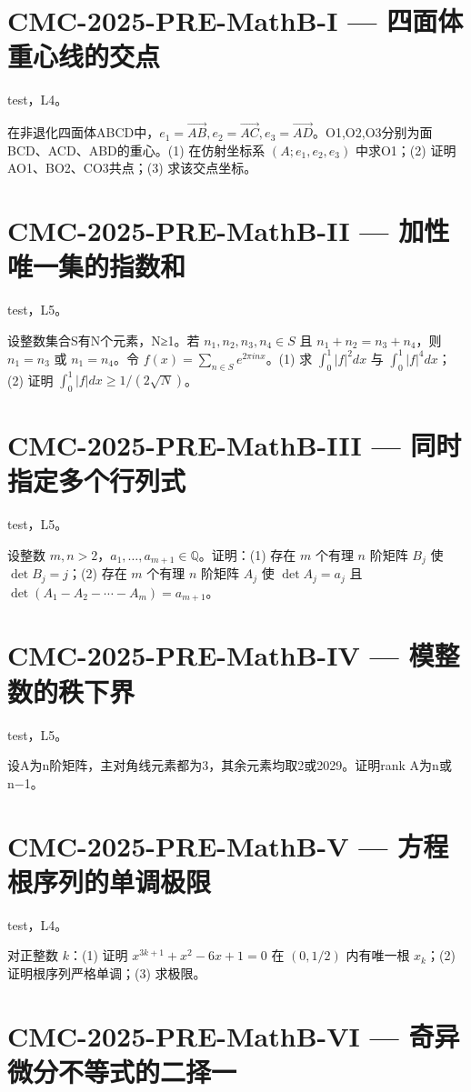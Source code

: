 \documentclass[UTF8]{ctexart}
\begin{document}
\section*{CMC-2025-PRE-MathB-I — 四面体重心线的交点}

test，L4。

在非退化四面体ABCD中，$e_1=\overrightarrow{AB},e_2=\overrightarrow{AC},e_3=\overrightarrow{AD}$。O1,O2,O3分别为面BCD、ACD、ABD的重心。(1) 在仿射坐标系 $(A;e_1,e_2,e_3)$ 中求O1；(2) 证明AO1、BO2、CO3共点；(3) 求该交点坐标。

\section*{CMC-2025-PRE-MathB-II — 加性唯一集的指数和}

test，L5。

设整数集合S有N个元素，N≥1。若 $n_1,n_2,n_3,n_4\in S$ 且 $n_1+n_2=n_3+n_4$，则 $n_1=n_3$ 或 $n_1=n_4$。令 $f(x)=\sum_{n\in S}e^{2\pi inx}$。(1) 求 $\int_0^1|f|^2dx$ 与 $\int_0^1|f|^4dx$；(2) 证明 $\int_0^1|f|dx\ge1/(2\sqrt N)$。

\section*{CMC-2025-PRE-MathB-III — 同时指定多个行列式}

test，L5。

设整数 $m,n>2$，$a_1,\ldots,a_{m+1}\in\mathbb Q$。证明：(1) 存在 $m$ 个有理 $n$ 阶矩阵 $B_j$ 使 $\det B_j=j$；(2) 存在 $m$ 个有理 $n$ 阶矩阵 $A_j$ 使 $\det A_j=a_j$ 且 $\det(A_1-A_2-\cdots-A_m)=a_{m+1}$。

\section*{CMC-2025-PRE-MathB-IV — 模整数的秩下界}

test，L5。

设A为n阶矩阵，主对角线元素都为3，其余元素均取2或2029。证明rank A为n或n−1。

\section*{CMC-2025-PRE-MathB-V — 方程根序列的单调极限}

test，L4。

对正整数 $k$：(1) 证明 $x^{3k+1}+x^2-6x+1=0$ 在 $(0,1/2)$ 内有唯一根 $x_k$；(2) 证明根序列严格单调；(3) 求极限。

\section*{CMC-2025-PRE-MathB-VI — 奇异微分不等式的二择一}
\end{document}
